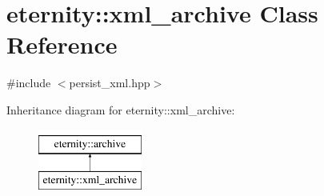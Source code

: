 \hypertarget{classeternity_1_1xml__archive}{}\section{eternity\+:\+:xml\+\_\+archive Class Reference}
\label{classeternity_1_1xml__archive}


{\ttfamily \#include $<$persist\+\_\+xml.\+hpp$>$}

Inheritance diagram for eternity\+:\+:xml\+\_\+archive\+:\begin{figure}[H]
\begin{center}
\leavevmode
\includegraphics[height=2.000000cm]{classeternity_1_1xml__archive}
\end{center}
\end{figure}
